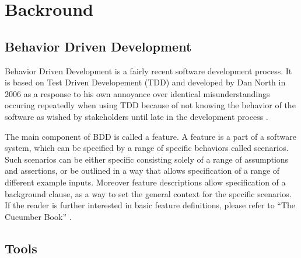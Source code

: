 \section{Backround}

\subsection{Behavior Driven Development}
\label{sub:bdd}
Behavior Driven Development is a fairly recent software development process. It is based on Test Driven Developement (TDD) and developed by Dan North in 2006 as a response to his own annoyance over identical misunderstandings occuring repeatedly when using TDD because of not knowing the behavior of the software as wished by stakeholders until late in the development process \cite{north2006}. 

The main component of BDD is called a feature. 
A feature is a part of a software system,
which can be specified by a range of specific behaviors called scenarios.
Such scenarios can be either specific consisting solely of a range of
assumptions and assertions, or be outlined in a way that allows
specification of a range of different example inputs.
Moreover feature descriptions allow specification of a background clause,
as a way to set the general context for the specific scenarios.
If the reader is further interested in basic feature definitions,
please refer to “The Cucumber Book” \cite{hellesoy2012}.

\subsection{Tools}